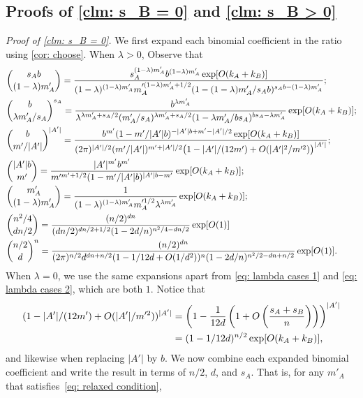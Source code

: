 \documentclass[11pt]{article}
\theoremstyle{plain}
\begin{document}
\subsection{Proofs of \cref{clm: s_B = 0} and \cref{clm: s_B > 0}}\label{sec: Janson simplifications}

\noindent\textit{Proof of \cref{clm: s_B = 0}.}
We first expand each binomial coefficient in the ratio using \cref{cor: choose}. When $\lambda > 0$, Observe that
 \begin{align}
     &\binom{s_Ab}{(1 - \lambda )m'_A} = \frac{s_A^{(1 - \lambda )m'_A}b^{(1 - \lambda )m'_A}\exp[O(k_A + k_B)]}{(1 - \lambda )^{(1 - \lambda )m'_A}m'^{(1 - \lambda )m'_A + 1/2}_A(1 - (1 - \lambda )m'_A/s_Ab)^{s_Ab - (1 - \lambda )m'_A}};\notag\\
    &\binom{b}{\lambda m'_A/s_A}^{s_A} = \frac{b^{\lambda m'_A}}{\lambda ^{\lambda m'_A + s_A/2}(m'_A/s_A)^{\lambda m'_A + s_A/2}(1 - \lambda m'_A/bs_A)^{bs_A - \lambda m'_A}}\exp[O(k_A + k_B)];\label{eq: lambda cases 1}\\
     &\binom{b}{m'/|A'|}^{|A'|} = \frac{b^{m'}(1 - m'/|A'|b)^{-|A'|b + m' - |A'|/2}\exp[O(k_A + k_B)]}{(2\pi)^{|A'|/2} (m'/|A'|)^{m' + |A'|/2}\big(1 - |A'|/(12m') + O(|A'|^2/m'^2)\big)^{|A'|}};\notag\\
     &\binom{|A'|b}{m'} = \frac{|A'|^{m'}b^{m'}}{m'^{m' + 1/2}(1 - m'/|A'|b)^{|A'|b - m'}}\exp[O(k_A + k_B)];\notag\\
     &\binom{m'_A}{(1 - \lambda )m'_A} = \frac{1}{(1 - \lambda )^{(1 - \lambda )m'_A}m'^{1/2}_A\lambda ^{\lambda m'_A}}\exp[O(k_A + k_B)];\label{eq: lambda cases 2}\\
     &\binom{n^2/4}{dn/2}   = \frac{(n/2)^{dn}}{(dn/2)^{dn/2 + 1/2}(1 - 2d/n)^{n^2/4 - dn/2}}\exp[O(1)]\notag\\
     &\binom{n/2}{d}^n = \frac{(n/2)^{dn}}{(2\pi)^{n/2}d^{dn + n/2}(1 - 1/12d + O(1/d^2))^{n}(1 - 2d/n)^{n^2/2 - dn + n/2}}\exp[O(1)].\notag
 \end{align}
 When $\lambda = 0$, we use the same expansions apart from \cref{eq: lambda cases 1} and \cref{eq: lambda cases 2}, which are both $1$.
  Notice that 
 \begin{align}
    (1 - |A'|/(12m') + O(|A'|/m'^2))^{|A'|} &=\left(1 - \frac{1}{12d}\left(1 +O\left(\frac{s_A + s_B}{n}\right)\right)\right)^{|A'|}\notag\\
    &= (1 - 1/12d)^{n/2}\exp[O(k_A + k_B)],\label{eq: stirling error fine}
\end{align}
and likewise when replacing $|A'|$ by $b$. We now combine each expanded binomial coefficient and write the result in terms of $n/2$, $d$, and $s_A$. That is, for any $m'_A$ that satisfies~\eqref{eq: relaxed condition},
\end{document}
